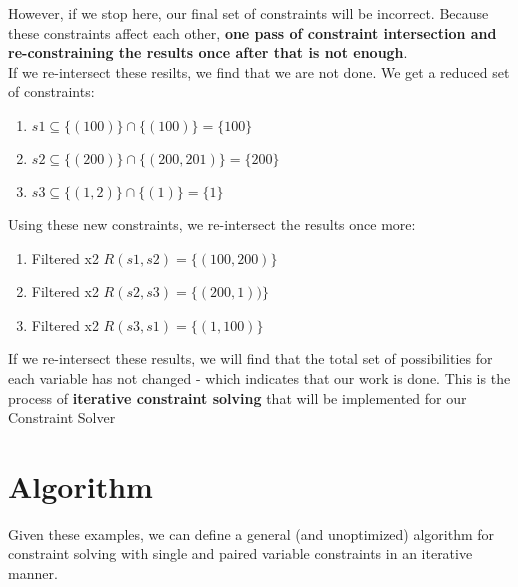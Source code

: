 \documentclass{article}
\begin{document}
However, if we stop here, our final set of constraints will be incorrect. Because these constraints affect each other, \textbf{one pass of constraint intersection and re-constraining the results once after that is not enough}. \\

If we re-intersect these resilts, we find that we are not done. We get a reduced set of constraints: 

\begin{enumerate}
    \item $s1 \subseteq \{(100)\} \cap \{(100)\}  = \{100\}$
    \item $s2 \subseteq \{(200)\} \cap \{(200, 201)\}  = \{200\}$
    \item $s3 \subseteq \{(1, 2)\} \cap \{(1)\}  = \{1\}$
\end{enumerate}

Using these new constraints, we re-intersect the results once more: 

\begin{enumerate}
    \item Filtered x2 $R(s1, s2) = \{(100, 200)\}$
    \item Filtered x2 $R(s2, s3) = \{(200, 1))\}$
    \item Filtered x2 $R(s3, s1) = \{(1, 100)\}$
\end{enumerate}

If we re-intersect these results, we will find that the total set of possibilities for each variable has not changed - which indicates that our work is done. This is the process of \textbf{iterative constraint solving} that will be implemented for our Constraint Solver

\newpage

\section{Algorithm}
Given these examples, we can define a general (and unoptimized) algorithm for constraint solving with single and paired variable constraints in an iterative manner. \\
\end{document}
